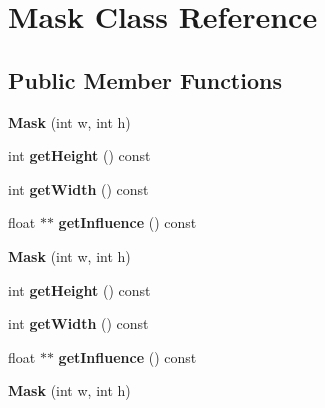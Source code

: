 \hypertarget{classMask}{\section{Mask Class Reference}
\label{classMask}
}
\subsection*{Public Member Functions}
\begin{DoxyCompactItemize}
\item 
\hypertarget{classMask_a1fdc1ca0927f8f6b792cc3130087f933}{{\bfseries Mask} (int w, int h)}\label{classMask_a1fdc1ca0927f8f6b792cc3130087f933}

\item 
\hypertarget{classMask_a38d79e2785ddb9b1684b1183963091af}{int {\bfseries get\-Height} () const }\label{classMask_a38d79e2785ddb9b1684b1183963091af}

\item 
\hypertarget{classMask_a3367b822da66a059ac6f16e79472566f}{int {\bfseries get\-Width} () const }\label{classMask_a3367b822da66a059ac6f16e79472566f}

\item 
\hypertarget{classMask_a5a7cfb7560ca289748040963b64f91ae}{float $\ast$$\ast$ {\bfseries get\-Influence} () const }\label{classMask_a5a7cfb7560ca289748040963b64f91ae}

\item 
\hypertarget{classMask_a1fdc1ca0927f8f6b792cc3130087f933}{{\bfseries Mask} (int w, int h)}\label{classMask_a1fdc1ca0927f8f6b792cc3130087f933}

\item 
\hypertarget{classMask_a38d79e2785ddb9b1684b1183963091af}{int {\bfseries get\-Height} () const }\label{classMask_a38d79e2785ddb9b1684b1183963091af}

\item 
\hypertarget{classMask_a3367b822da66a059ac6f16e79472566f}{int {\bfseries get\-Width} () const }\label{classMask_a3367b822da66a059ac6f16e79472566f}

\item 
\hypertarget{classMask_aa5e2ba0ebc60c897e19d02cc1ad7fb7e}{float $\ast$$\ast$ {\bfseries get\-Influence} () const }\label{classMask_aa5e2ba0ebc60c897e19d02cc1ad7fb7e}

\item 
\hypertarget{classMask_a1fdc1ca0927f8f6b792cc3130087f933}{{\bfseries Mask} (int w, int h)}\label{classMask_a1fdc1ca0927f8f6b792cc3130087f933}


\end{DoxyCompactItemize}
